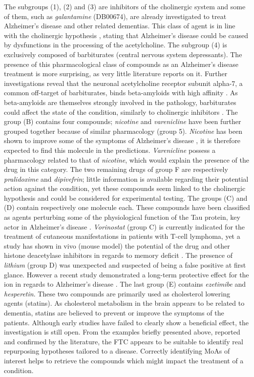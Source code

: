 \documentclass{bioinfo}
\begin{document}
The subgroups (1), (2) and (3) are inhibitors of the cholinergic system and some of them, such as \emph{galantamine} (DB00674), are already 
investigated to treat Alzheimer's disease and other related dementias. This class of agent is in line with the 
cholinergic hypothesis \citep{Francis1999}, stating that Alzheimer's disease could be caused by dysfunctions in the processing of the
acetylcholine. The subgroup (4) is exclusively composed of barbiturates (central nervous system depressants). 
The presence of this pharmacological class of compounds as an Alzheimer's disease treatment is more surprising, as very little 
literature reports on it. Further investigations reveal that the neuronal acetylcholine receptor subunit alpha-7, a 
common off-target of barbiturates, binds beta-amyloids with high affinity \citep{Wang2000}. As beta-amyloids are themselves strongly involved 
in the pathology, barbiturates could affect the state of the condition, similarly to cholinergic inhibitors \citep{Wang2000}.
The group (B) contains four compounds; \emph{nicotine} and \emph{varenicline} have been further grouped together because of 
similar pharmacology (group 5).
\emph{Nicotine} has been shown to improve some of the symptoms of Alzheimer's disease \citep{Jones1992}, it is therefore expected to 
find this molecule in the predictions. \emph{Varenicline} possess a pharmacology related to that of \emph{nicotine}, which would explain 
the presence of the drug in this category. The two remaining drugs of group F are respectively \emph{pralidoxime} and \emph{dipivefrin}; 
little information is available regarding their potential action against the condition, yet these compounds seem linked to the 
cholinergic hypothesis and could be considered for experimental testing.
The groups (C) and (D) contain respectively one molecule each. These compounds have been classified as agents perturbing some of 
the physiological function of the Tau protein, key actor in Alzheimer's 
disease \citep{Grundke-Iqbal1986}. \emph{Vorinostat} (group C) is currently 
indicated for the treatment of cutaneous manifestations in patients with T-cell lymphoma, yet a study has 
shown in vivo (mouse model) the potential of the drug and other histone deacetylase inhibitors in regards to memory 
deficit \citep{Kilgore2010}. The presence of \emph{lithium} (group D) was 
unexpected and suspected of being a false positive at first glance. However a recent study demonstrated a long-term 
protective effect for the ion in regards to Alzheimer's disease \citep{Young2011}. The last group (E) contains 
\emph{ezetimibe} and \emph{hesperetin}. These two compounds are primarily used as cholesterol lowering agents (statins). As cholesterol 
metabolism in the brain appears to be related to dementia, statins are believed to prevent or improve the symptoms of the 
patients. Although early studies \citep{Wolozin2004} have failed to clearly show a beneficial effect, the investigation is still open.
From the examples briefly presented above, reported and confirmed by the literature, the FTC appears to be suitable to 
identify real repurposing hypotheses tailored to a disease. Correctly 
identifying MoAs of interest helps to retrieve the compounds which might impact 
the treatment of a condition.
\end{document}
